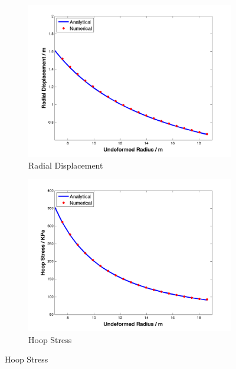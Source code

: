 \begin{figure}[H]
	\begin{subfigure}[b]{0.5\textwidth}
		\centering
		\includegraphics[width=\textwidth]{./figures/ur_200.png}
		\caption{Radial Displacement}
		\label{ur_200}
	\end{subfigure}
	\begin{subfigure}[b]{0.5\textwidth}
		\centering
		\includegraphics[width=\textwidth]{./figures/hoop_stress_200.png}
		\caption{Hoop Stress}
		\label{hoop_200}
	\end{subfigure}
	

\end{figure}

